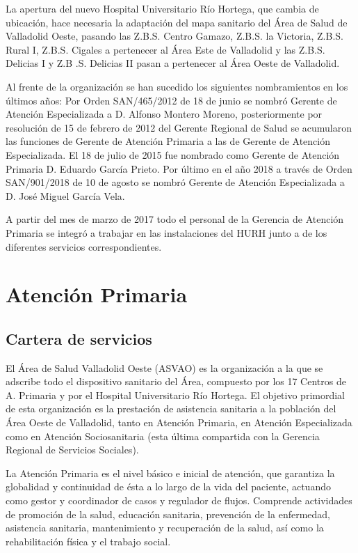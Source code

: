La apertura del nuevo Hospital Universitario Río Hortega, que cambia de ubicación, hace necesaria la adaptación del mapa sanitario del Área de Salud de Valladolid Oeste, pasando las Z.B.S. Centro Gamazo, Z.B.S. la Victoria, Z.B.S. Rural I, Z.B.S. Cigales a pertenecer al Área Este de Valladolid y las Z.B.S. Delicias I y Z.B .S. Delicias II pasan a pertenecer al Área Oeste de Valladolid.

Al frente de la organización se han sucedido los siguientes nombramientos en los últimos años: Por Orden SAN/465/2012 de 18 de junio \cite{noauthor_orden_2012} se nombró Gerente de Atención Especializada a D. Alfonso Montero Moreno, posteriormente por resolución de 15 de febrero de 2012 del Gerente Regional de Salud se acumularon las funciones de Gerente de Atención Primaria a las de Gerente de Atención Especializada.
El 18 de julio de 2015 fue nombrado como Gerente de Atención Primaria D. Eduardo García Prieto.
Por último en el año 2018 a través de Orden SAN/901/2018 de 10 de agosto \cite{noauthor_orden_2018} se nombró Gerente de Atención Especializada a D. José Miguel García Vela.

A partir del mes de marzo de 2017 todo el personal de la Gerencia de Atención Primaria se integró a trabajar en las instalaciones del HURH junto a de los diferentes servicios correspondientes.

\section{Atención Primaria}

\subsection{Cartera de servicios}

El Área de Salud Valladolid Oeste (ASVAO) es la organización a la que se adscribe todo el dispositivo sanitario del Área, compuesto por los 17 Centros de A. Primaria y por el Hospital Universitario Río Hortega.
El objetivo primordial de esta organización es la prestación de asistencia sanitaria a la población del Área Oeste de Valladolid, tanto en Atención Primaria, en Atención Especializada como en Atención Sociosanitaria (esta última compartida con la Gerencia Regional de Servicios Sociales).

La Atención Primaria es el nivel básico e inicial de atención, que garantiza la globalidad y continuidad de ésta a lo largo de la vida del paciente, actuando como gestor y coordinador de casos y regulador de flujos.
Comprende actividades de promoción de la salud, educación sanitaria, prevención de la enfermedad, asistencia sanitaria, mantenimiento y recuperación de la salud, así como la rehabilitación física y el trabajo social.

